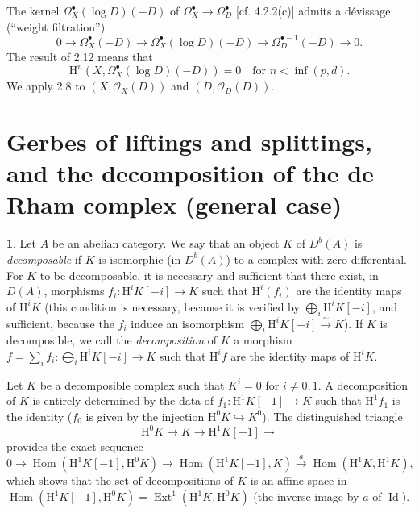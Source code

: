 \documentclass[10pt,reqno]{article}
\renewcommand{\H}{\mathrm{H}}
\renewcommand{\O}{\mathcal{O}}
\newcommand{\bh}{^\bullet}
\DeclareMathOperator{\Hom}{Hom}
\DeclareMathOperator{\Ext}{Ext}
\DeclareMathOperator{\Id}{Id}
\theoremstyle{plain}
\theoremstyle{definition}
\newtheorem{blk}[thm]{}
\begin{document}
The kernel $\Omega_X\bh(\log D)(-D)$ of $\Omega_X\bh\to\Omega_D\bh$ [cf. 4.2.2(c)] admits a
d{\'e}vissage (``weight filtration'')
\[
  0\longrightarrow\Omega_X\bh(-D)\longrightarrow\Omega_X\bh(\log D)(-D)\longrightarrow\Omega_D^{\bullet-1}(-D)\longrightarrow 0.
\]
The result of 2.12 means that
\[
  \H^n(X,\Omega_X\bh(\log D)(-D))=0\quad\text{for }n<\inf(p,d).
\]
We apply 2.8 to $(X,\O_X(D))$ and $(D,\O_D(D))$.

\section{Gerbes of liftings and splittings, and the decomposition of the de Rham complex (general case)}

\begin{blk}
Let $A$ be an abelian category. We say that an object $K$ of $D^b(A)$ is \emph{decomposable} if $K$
is isomorphic (in $D^b(A)$) to a complex with zero differential. For $K$ to be decomposable, it is
necessary and sufficient that there exist, in $D(A)$, morphisms $f_i:\H^i K[-i]\to K$ such that
$\H^i(f_i)$ are the identity maps of $\H^i K$ (this condition is necessary, because it is verified by
$\bigoplus_i\H^i K[-i]$, and sufficient, because the $f_i$ induce an isomorphism
$\bigoplus_i\H^i K[-i]\xrightarrow{\sim}K$). If $K$ is decomposible, we call the \emph{decomposition}
of $K$ a morphism $f=\sum_i f_i:\bigoplus_i\H^i K[-i]\to K$ such that $\H^i f$ are the identity maps
of $\H^i K$.

Let $K$ be a decomposible complex such that $K^i=0$ for $i\neq 0,1$. A decomposition of $K$ is entirely
determined by the data of $f_1:\H^1 K[-1]\to K$ such that $\H^1 f_1$ is the identity ($f_0$ is given by
the injection $\H^0 K\hookrightarrow K^0$). The distinguished triangle
\[
  \H^0 K\longrightarrow K\longrightarrow\H^1 K[-1]\longrightarrow
\]
provides the exact sequence
\[
  0\longrightarrow\Hom(\H^1 K[-1],\H^0 K)\longrightarrow\Hom(\H^1 K[-1],K)\xrightarrow{\ a\ }\Hom(\H^1 K,\H^1 K),
\]
which shows that the set of decompositions of $K$ is an affine space in $\Hom(\H^1 K[-1],\H^0 K)=\Ext^1(\H^1 K,\H^0 K)$
(the inverse image by $a$ of $\Id$).
\end{blk}
\end{document}

